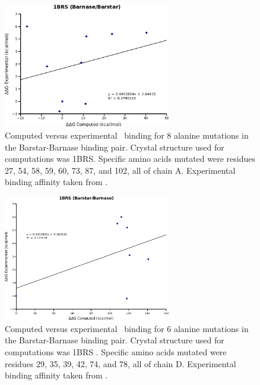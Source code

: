 \begin{figure}[h]
  \centering
  \includegraphics[width=0.65\textwidth]{figures/1brs_barnase_barstar.png}
  \caption{
Computed versus experimental \ddg\ binding for 8 alanine mutations in the Barstar-Barnase binding pair.
Crystal structure used for computations was 1BRS.
Specific amino acids mutated were residues 27, 54, 58, 59, 60, 73, 87, and 102, all of chain A.
Experimental binding affinity taken from \protect\cite{thorn2001asedb}.
            }
\end{figure}

\begin{figure}[h]
  \centering
  \includegraphics[width=0.65\textwidth]{figures/1brs_barstar_barnase.png}
  \caption{
Computed versus experimental \ddg\ binding for 6 alanine mutations in the Barstar-Barnase binding pair.
Crystal structure used for computations was 1BRS \protect\cite{buckle1994protein}.
Specific amino acids mutated were residues 29, 35, 39, 42, 74, and 78, all of chain D.
Experimental binding affinity taken from \protect\cite{thorn2001asedb}.
            }
\end{figure}

